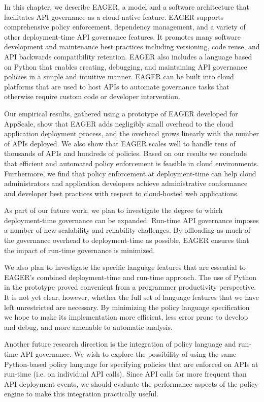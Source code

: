 In this chapter, we describe EAGER, a model and a software architecture that 
facilitates API governance as a cloud-native feature. EAGER supports comprehensive policy
enforcement, dependency management, and a variety of other deployment-time API
governance features. It promotes many software development and maintenance
best practices including versioning, code reuse, and API backwards
compatibility retention. EAGER also includes a language based on Python that enables
creating, debugging, and maintaining API governance policies in a simple and intuitive
manner. EAGER can be built into cloud platforms that are used to host APIs
to automate governance tasks that otherwise require custom code or developer intervention.

Our empirical results, gathered using a prototype of EAGER developed for AppScale,
show that EAGER adds negligibly small overhead to the cloud application 
deployment process, and the overhead grows linearly
with the number of APIs deployed. We also show that EAGER scales well 
to handle tens of thousands of APIs and hundreds of policies. Based on our
results we conclude that efficient and automated policy enforcement is feasible
in cloud environments. Furthermore, we find that policy enforcement at deployment-time can help
cloud administrators and application developers achieve administrative 
conformance and developer best practices with respect to cloud-hosted 
web applications.

As part of our future work, we plan to investigate the degree to which
deployment-time governance can be expanded.
Run-time API governance imposes a number of new scalability and
reliability challenges.  By offloading as much of the governance overhead to
deployment-time as possible, EAGER ensures that the impact of run-time
governance is minimized.  

We also plan to investigate the specific language features that are essential
to EAGER's combined deployment-time and run-time approach.  The use of Python
in the prototype proved convenient from a programmer productivity perspective.
It is not yet clear, however, whether the full set of language features that
we have left unrestricted are necessary.  By minimizing the policy language
specification we hope to make its implementation more efficient, less
error prone to develop and debug, and more amenable to automatic analysis.

Another future research direction is the integration of policy language and
run-time API governance.
We wish to explore the possibility of using the same Python-based
policy language for
specifying policies that are enforced on APIs at run-time (i.e. on individual
API calls). Since API calls
far more frequent than API deployment events, we should evaluate
the performance aspects of the policy engine to make this integration practically useful.
